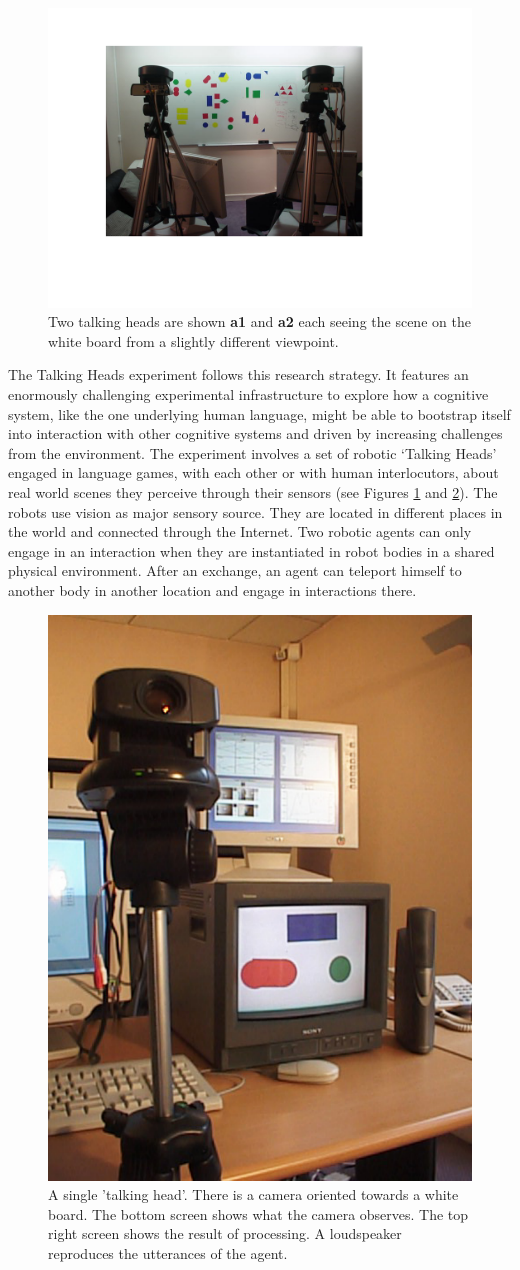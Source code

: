 \begin{figure}[htbp]
  \centerline{\includegraphics[width=.65\textwidth]{chap1/figs/heads}}
\caption{\small Two talking heads are shown {\bf a1} and 
{\bf a2} each seeing the scene on the white board from a slightly different viewpoint.}
\label{f:plate1}
\end{figure}

The Talking Heads experiment follows this research strategy. 
It features an enormously challenging experimental
infrastructure to explore how a cognitive
system, like the one underlying human language, might
be able to bootstrap itself into interaction 
with other cognitive systems and driven by increasing
challenges from the environment. The experiment
involves a set of robotic `Talking Heads' engaged in language
games, with each other or with human interlocutors, 
about real world scenes they perceive through their sensors
(see Figures \ref{f:plate1} and \ref{f:plate2}). 
The robots use vision as major sensory source. They are located in
different places in the world and connected through the Internet. 
Two robotic agents can only engage in an interaction when they 
are instantiated in robot bodies in a shared physical environment. 
After an exchange, an agent can teleport himself to another body in 
another location and engage in interactions there. 

\begin{figure}[htbp]
  \centerline{\includegraphics[width=.40\textwidth]{chap1/figs/head}}
\caption{\small A single 'talking head'. There is a camera oriented towards a
white board. The bottom screen shows what the camera observes. The top right screen shows the result of processing.
A loudspeaker reproduces the utterances of the agent. }
\label{f:plate2}
\end{figure}

